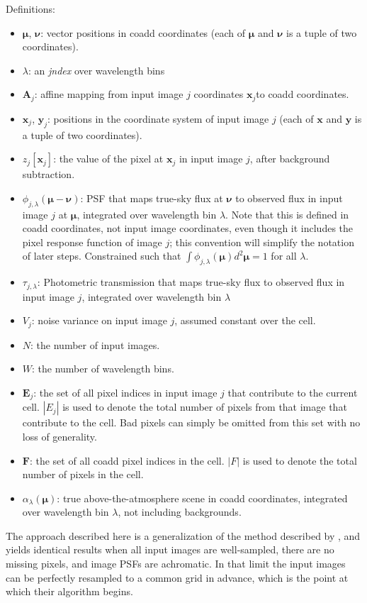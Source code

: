 \documentclass[DM,authoryear,toc]{lsstdoc}
\begin{document}
Definitions:
\begin{itemize}
\item $\bm{\mu}$, $\bm{\nu}$: vector positions in coadd coordinates (each of $\bm{\mu}$ and $\bm{\nu}$ is a tuple of two coordinates).
\item $\lambda$: an \emph{jndex} over wavelength bins
\item $\bm{A}_j$: affine mapping from input image $j$ coordinates $\bm{x}_j$to coadd coordinates.
\item $\bm{x}_{j}$, $\bm{y}_j$: positions in the coordinate system of input image $j$ (each of $\bm{x}$ and $\bm{y}$ is a tuple of two coordinates).
\item $z_{j}[\bm{x}_j]$: the value of the pixel at $\bm{x}_j$ in input image $j$, after background subtraction.
\item $\phi_{j,\lambda}(\bm{\mu}-\bm{\nu})$: PSF that maps true-sky flux at $\bm{\nu}$ to observed flux in input image $j$ at $\bm{\mu}$, integrated over wavelength bin $\lambda$.  Note that this is defined in coadd coordinates, not input image coordinates, even though it includes the pixel response function of image $j$; this convention will simplify the notation of later steps.  Constrained such that
$\int \phi_{j,\lambda}(\bm{\mu}) d^2\bm{\mu} = 1$ for all $\lambda$.
\item $\tau_{j,\lambda}$: Photometric transmission that maps true-sky flux to observed flux in input image $j$, integrated over wavelength bin $\lambda$
\item $V_{j}$: noise variance on input image $j$, assumed constant over the cell.
\item $N$: the number of input images.
\item $W$: the number of wavelength bins.
\item $\bm{E}_j$: the set of all pixel indices in input image $j$ that contribute to the current cell.  $|E_j|$ is used to denote the total number of pixels from that image that contribute to the cell.  Bad pixels can simply be omitted from this set with no loss of generality.
\item $\bm{F}$: the set of all coadd pixel indices in the cell.  $|F|$ is used to denote the total number of pixels in the cell.
\item $\alpha_{\lambda}(\bm{\mu})$: true above-the-atmosphere scene in coadd coordinates, integrated over wavelength bin $\lambda$, not including backgrounds.
\end{itemize}

The approach described here is a generalization of the method described by \citet{2015arXiv151206879Z}, and yields identical results when all input images are well-sampled, there are no missing pixels, and image PSFs are achromatic.  In that limit the input images can be perfectly resampled to a common grid in advance, which is the point at which their algorithm begins.
\end{document}
